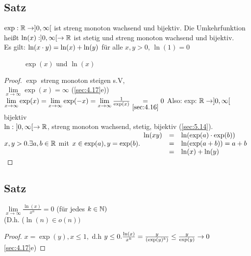 \subsection[Satz: Exponentialfunktion und Logarithmus naturalis]{Satz}\label{sec:5.16}
$\exp : \mathbb{R} \to ]0,\infty[$ ist streng monoton wachsend und bijektiv. Die Umkehrfunktion hei\ss t $\ln(x) : ]0,\infty[ \to \mathbb{R}$ ist stetig und streng monoton wachsend und bijektiv.\\
Es gilt: $\ln(x \cdot y) = \ln(x) + \ln(y)$ für alle $x,y > 0$, $\ln(1) = 0$
\begin{figure}[h!]
\centering
{}
\caption{$\exp(x)$ und $\ln(x)$}
\end{figure}
\begin{proof}
$\exp$ streng monoton steigen s.V,\\
$\lim\limits_{x \to \infty} \exp(x) = \infty$ \hfill(\ref{sec:4.17}e))\\
$\lim\limits_{x \to \infty} \exp(x) = \lim\limits_{x \to \infty} \exp(-x) = \lim\limits_{x \to \infty} \frac{1}{\exp(x)} \underset{\ref{sec:4.16}}{=} 0$
Also: exp: $\mathbb{R} \to ]0,\infty[$ bijektiv\\
$\ln:\ ]0,\infty[ \to \mathbb{R}$, streng monoton wachsend, stetig, bijektiv (\ref{sec:5.14}).\\
$x,y > 0. \exists a,b \in \mathbb{R} $ mit $x \in \exp(a), y =\exp(b).\\
\begin{array}{lcl}
\ln(xy) &=& \ln(\exp(a)  \cdot \exp(b))\\
&=& \ln(\exp(a+b)) = a + b\\
&=& \ln(x) + \ln(y)\\
\end{array}$\\
\end{proof}
\subsection[Satz: Wachstum des natürlichen Logarithmus']{Satz}\label{sec:5.17}
$\lim\limits_{x \to \infty} \frac{\ln(x)}{x^n} = 0$ (für jedes $k \in \mathbb{N})$\\
(D.h. ($\ln(n) \in o(n))$\\
\begin{proof}
$x = \exp(y), x \leq 1,$ d.h $y \leq 0.\\
\frac{\ln(x)}{x^k} = \frac{y}{(\exp(y)^k)} \leq \frac{y}{\exp(y)} \to 0 $\ref{sec:4.17}e)
\end{proof}
